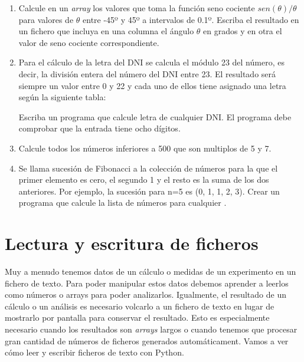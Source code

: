 \documentclass[letterpaper,10pt,spanish]{sphinxmanual}
\begin{document}
\begin{enumerate}
\item {} 
Calcule en un \emph{array} los valores que toma la función seno cociente $sen(\theta)/\theta$ para valores de $\theta$ entre -45º y 45º a intervalos de 0.1º. Escriba el resultado en un fichero que incluya en una columna el ángulo  $\theta$ en grados y en otra el valor de seno cociente correspondiente.

\item {} 
Para el cálculo de la letra del DNI se calcula el módulo 23 del número, es decir, la división entera del número del DNI entre 23. El resultado será siempre un valor entre 0 y 22 y cada uno de ellos tiene asignado una letra según la siguiente tabla:



Escriba un programa que calcule letra de cualquier DNI. El programa debe comprobar que la entrada tiene ocho dígitos.

\item {} 
Calcule todos los números inferiores a 500 que son multiplos de 5 y 7.

\item {} 
Se llama sucesión de Fibonacci a la colección de  números para la que el primer elemento es cero, el segundo 1 y el resto es la suma de los dos anteriores. Por ejemplo, la sucesión para n=5 es (0, 1, 1, 2, 3). Crear un programa que calcule la lista de números para cualquier .

\end{enumerate}


\chapter{Lectura y escritura de ficheros}
\label{lectura_ficheros::doc}\label{lectura_ficheros:lectura-y-escritura-de-ficheros}
Muy a menudo tenemos datos de un cálculo o medidas de un experimento en un fichero de texto. Para poder manipular estos datos debemos aprender a leerlos como números o arrays para poder analizarlos. Igualmente, el resultado de un cálculo o un análisis es necesario volcarlo a un fichero de texto en lugar de mostrarlo por pantalla para conservar el resultado. Esto es especialmente necesario cuando los resultados son \emph{arrays} largos o cuando tenemos que procesar gran cantidad de números de ficheros generados automáticament. Vamos a ver cómo leer y escribir ficheros de texto con Python.
\end{document}

